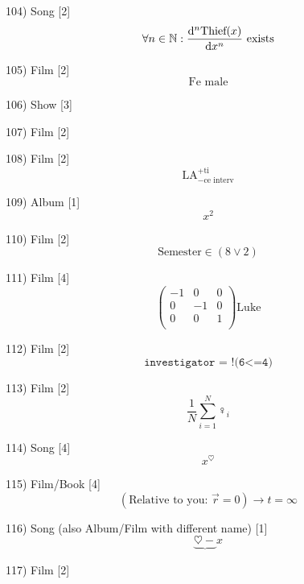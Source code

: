 \documentclass[10pt]{article}
\begin{document}
    104) Song [2]
    \[
      \forall n \in \mathbb{N}:  \dv[n]{\text{Thief}(x)}{x} \text{ exists}
    \]
      
    105) Film [2]
    \[
        \text{Fe male}
    \]

    106) Show [3]
    \begin{figure}
    \end{figure}
    
    107) Film [2]
    \begin{figure}
    \end{figure}

    108) Film [2]
    \[
      \text{LA}^{+ \text{ti}}_{-\text{ce interv}}
    \]

    109) Album [1]
    \[
      x^2
    \]
    
    110) Film [2]
    \[
      \text{Semester} \in (8  \lor 2)
    \]

    111) Film [4]
    \[
        \begin{pmatrix}
          -1 & 0 & 0 \\
          0 & -1 & 0 \\
          0 & 0  & 1 \\
        \end{pmatrix}
        \text{Luke} 
    \]

    112) Film [2]
    \[
      \texttt{investigator = !(6<=4)}
    \]

    113) Film [2]
    \[
        \frac{1}{N} \sum_{i=1}^{N}\female_i
\]

    114) Song [4]
    \[
      x^\heartsuit
    \]

    115) Film/Book [4]
    \[
      (\text{Relative to you: } \vec{r}=0 ) \to t = \infty
    \]

    116) Song (also Album/Film with different name) [1]
    \[
        \underbrace{\heartsuit -} x   
    \]

    117) Film [2]
    \begin{figure}
    \end{figure}
\end{document}
